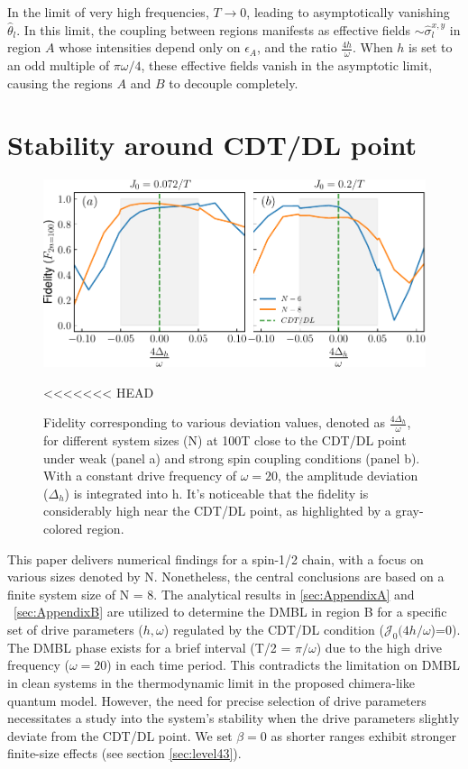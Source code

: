 \documentclass[12pt]{iopart}
\begin{document}
In the limit of very high frequencies, $T\rightarrow 0$, leading to asymptotically vanishing $\hat{\theta}_l$. In this limit, the coupling between regions manifests as effective fields $\sim \hat{\sigma}^{x,y}_l$ in region $A$ whose intensities depend only on $\epsilon_A$, and the ratio $\frac{4h}{\omega}$. When $h$ is set to an odd multiple of $\pi\omega/4$, these effective fields vanish in the asymptotic limit, causing the regions $A$ and $B$ to decouple completely.

\section{\label{sec:AppendixC} Stability around CDT/DL point}
\begin{figure}[t]
	\begin{center}
		\includegraphics[width=12cm]{figure14.pdf}
	\end{center}
<<<<<<< HEAD
	\caption{Fidelity corresponding to various deviation values, denoted as $\frac{4\Delta_h}{\omega}$, for different system sizes (N) at 100T close to the CDT/DL point under weak (panel a) and strong spin coupling conditions (panel b). With a constant drive frequency of $\omega= 20$, the amplitude deviation ($\Delta_h$) is integrated into h. It's noticeable that the fidelity is considerably high near the CDT/DL point, as highlighted by a gray-colored region.}
	\label{Fig:aroundCDT}
\end{figure}
This paper delivers numerical findings for a spin-1/2 chain, with a focus on various sizes denoted by N. Nonetheless, the central conclusions are based on a finite system size of N = 8. The analytical results in \ref{sec:AppendixA} and ~\ref{sec:AppendixB} are utilized to determine the DMBL in region B for a specific set of drive parameters ($h, \omega$) regulated by the CDT/DL condition ($\mathcal{J}_0(4h/\omega$)=0). The DMBL phase exists for a brief interval (T/2 = $\pi/\omega$) due to the high drive frequency ($\omega=20$) in each time period. This contradicts the limitation on DMBL in clean systems in the thermodynamic limit\cite{Mahbub2024} in the proposed chimera-like quantum model. However, the need for precise selection of drive parameters necessitates a study into the system's stability when the drive parameters slightly deviate from the CDT/DL point. We set $\beta = 0$ as shorter ranges exhibit stronger finite-size effects (see section \ref{sec:level43}).
\end{document}
